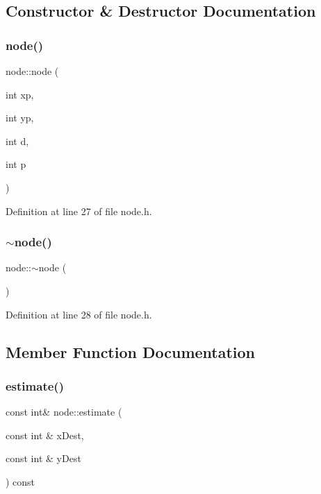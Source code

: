 \subsection{Constructor \& Destructor Documentation}
\mbox{\label{classnode_a802701cab6639590de6f16136184c2de}} 
\subsubsection{\texorpdfstring{node()}{node()}}
{\footnotesize\ttfamily node\+::node (\begin{DoxyParamCaption}\item[{int}]{xp,  }\item[{int}]{yp,  }\item[{int}]{d,  }\item[{int}]{p }\end{DoxyParamCaption})\hspace{0.3cm}{\ttfamily [inline]}}



Definition at line 27 of file node.\+h.

\mbox{\label{classnode_a482f83436a89f09d289b26144d817adf}} 
\subsubsection{\texorpdfstring{$\sim$node()}{~node()}}
{\footnotesize\ttfamily node\+::$\sim$node (\begin{DoxyParamCaption}{ }\end{DoxyParamCaption})\hspace{0.3cm}{\ttfamily [inline]}}



Definition at line 28 of file node.\+h.



\subsection{Member Function Documentation}
\mbox{\label{classnode_acd0a1c2330a9984fa120fe7a6f169680}} 
\subsubsection{\texorpdfstring{estimate()}{estimate()}}
{\footnotesize\ttfamily const int\& node\+::estimate (\begin{DoxyParamCaption}\item[{const int \&}]{x\+Dest,  }\item[{const int \&}]{y\+Dest }\end{DoxyParamCaption}) const\hspace{0.3cm}{\ttfamily [inline]}}



